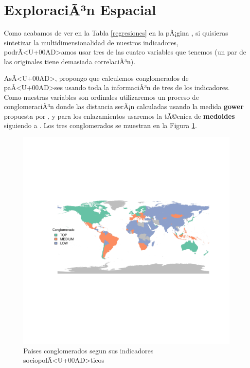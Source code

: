 \documentclass{article}
\begin{document}
\clearpage

\section{ExploraciÃ³n Espacial}

Como acabamos de ver en la Tabla \ref{regresiones} en la pÃ¡gina \pageref{regresiones}, si quisieras sintetizar la multidimensionalidad de nuestros indicadores, podrÃ<U+00AD>amos usar tres de las cuatro variables que tenemos (un par de las originales tiene demasiada correlaciÃ³n). 

AsÃ<U+00AD>, propongo que calculemos conglomerados de paÃ<U+00AD>ses usando toda la informaciÃ³n de tres de los indicadores. Como nuestras variables son ordinales utilizaremos un proceso de conglomeraciÃ³n donde las distancia serÃ¡n calculadas usando la medida {\bf gower}
propuesta por 
\cite{gower_general_1971}
, y para los enlazamientos usaremos la tÃ©cnica de {\bf medoides} 
siguiendo a \cite{reynolds_clustering_2006}
. Los tres conglomerados se muestran en la Figura \ref{clustmap}.






\begin{figure}[h]
\centering
\begin{adjustbox}{width=11cm,height=8cm,clip,trim=1cm 2.5cm 0cm 2.5cm}
\includegraphics{paperVersion_6-plotMap1}
\end{adjustbox}
\caption{Paises conglomerados segun sus indicadores sociopolÃ<U+00AD>ticos}\label{clustmap}
\end{figure}

\renewcommand{\refname}{Bibliografia} %

\end{document}
